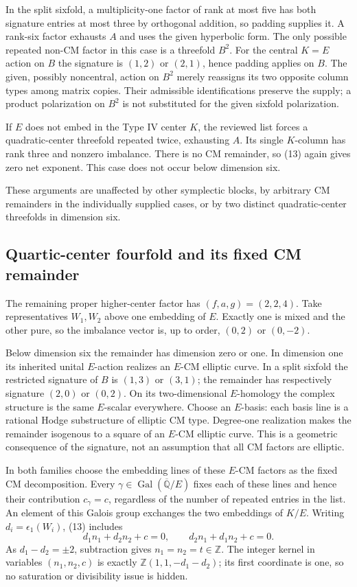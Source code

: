 \documentclass[11pt]{article}
\newcommand{\Z}{\mathbb Z}
\newcommand{\kk}{{\overline{\mathbb Q}}}
\DeclareMathOperator{\Gal}{Gal}
\theoremstyle{remark}
\begin{document}
In the split sixfold, a multiplicity-one factor of rank at most five
has both signature entries at most three by orthogonal addition, so
padding supplies it. A rank-six factor exhausts $A$ and uses the
given hyperbolic form. The only possible repeated non-CM factor in
this case is a threefold $B^2$. For the central $K=E$ action on $B$
the signature is $(1,2)$ or $(2,1)$, hence padding applies on $B$.
The given, possibly noncentral, action on $B^2$ merely reassigns its
two opposite column types among matrix copies. Their admissible
identifications preserve the supply; a product polarization on $B^2$
is not substituted for the given sixfold polarization.

If $E$ does not embed in the Type IV center $K$, the reviewed list
forces a quadratic-center threefold repeated twice, exhausting $A$.
Its single $K$-column has rank three and nonzero imbalance.
There is no CM remainder, so (13) again gives zero net exponent.
This case does not occur below dimension six.

These arguments are unaffected by other symplectic blocks, by arbitrary
CM remainders in the individually supplied cases, or by two distinct
quadratic-center threefolds in dimension six.

\subsection{Quartic-center fourfold and its fixed CM remainder}

The remaining proper higher-center factor has $(f,a,g)=(2,2,4)$.
Take representatives $W_1,W_2$ above one embedding of $E$.
Exactly one is mixed and the other pure, so the imbalance vector is,
up to order, $(0,2)$ or $(0,-2)$.

Below dimension six the remainder has dimension zero or one.
In dimension one its inherited unital $E$-action realizes an $E$-CM
elliptic curve. In a split sixfold the restricted signature of $B$ is
$(1,3)$ or $(3,1)$; the remainder has respectively signature $(2,0)$
or $(0,2)$. On its two-dimensional $E$-homology the complex structure
is the same $E$-scalar everywhere. Choose an $E$-basis: each basis
line is a rational Hodge substructure of elliptic CM type.
Degree-one realization makes the remainder isogenous to a square of
an $E$-CM elliptic curve. This is a geometric consequence of the
signature, not an assumption that all CM factors are elliptic.

In both families choose the embedding lines of these $E$-CM factors
as the fixed CM decomposition. Every $\gamma\in\Gal(\kk/E)$ fixes
each of these lines and hence their contribution $c_\gamma=c$,
regardless of the number of repeated entries in the list.
An element of this Galois group exchanges the two embeddings of $K/E$.
Writing $d_i=\epsilon_1(W_i)$, (13) includes
\[
 d_1n_1+d_2n_2+c=0,\qquad
 d_2n_1+d_1n_2+c=0.
 \tag{14}\label{eq:quartic}
\]
As $d_1-d_2=\pm2$, subtraction gives $n_1=n_2=t\in\Z$.
The integer kernel in variables $(n_1,n_2,c)$ is exactly
$\Z(1,1,-d_1-d_2)$; its first coordinate is one, so no saturation
or divisibility issue is hidden.
\end{document}
